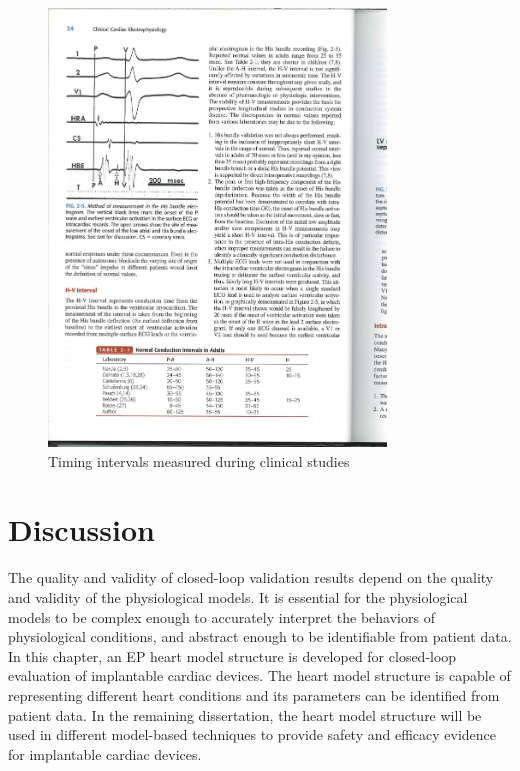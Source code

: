 \begin{figure}[!t]
\centering
		\includegraphics[width=0.8\textwidth]{figs/intervals.pdf}
		
\caption{\small Timing intervals measured during clinical studies \cite{josephson}}
\label{fig:intervals}
\end{figure} 







\section{Discussion}
The quality and validity of closed-loop validation results depend on the quality and validity of the physiological models.
It is essential for the physiological models to be complex enough to accurately interpret the behaviors of physiological conditions, and abstract enough to be identifiable from patient data.
In this chapter, an EP heart model structure is developed for closed-loop evaluation of implantable cardiac devices. 
The heart model structure is capable of representing different heart conditions and its parameters can be identified from patient data.
In the remaining dissertation, the heart model structure will be used in different model-based techniques to provide safety and efficacy evidence for implantable cardiac devices.



 